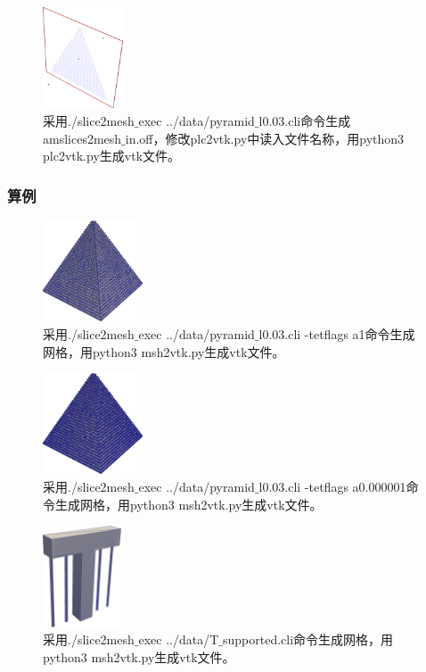 \begin{figure}[!htbp]
  \centering
  \includegraphics[height=3cm]{fig/1/1.1.7.1:6.png}
  \caption{采用./slice2mesh$\_$exec ../data/pyramid$\_$l0.03.cli命令生成amslices2mesh$\_$in.off，修改plc2vtk.py中读入文件名称，用python3 plc2vtk.py生成vtk文件。}
  \label{fig:1-7}
\end{figure}


\subsubsection{算例}

\begin{figure}[!htbp]
  \centering
  \includegraphics[height=3cm]{fig/1/20.png}
  \caption{采用./slice2mesh$\_$exec ../data/pyramid$\_$l0.03.cli -tetflags a1命令生成网格，用python3 msh2vtk.py生成vtk文件。}
  \label{fig:1-7}
\end{figure}

\begin{figure}[!htbp]
  \centering
  \includegraphics[height=3cm]{fig/1/21.png}
  \caption{采用./slice2mesh$\_$exec ../data/pyramid$\_$l0.03.cli -tetflags a0.000001命令生成网格，用python3 msh2vtk.py生成vtk文件。}
  \label{fig:1-7}
\end{figure}

\begin{figure}[!htbp]
  \centering
  \includegraphics[height=3cm]{fig/1/1.1.7.2:3.png}
  \caption{采用./slice2mesh$\_$exec ../data/T$\_$supported.cli命令生成网格，用python3 msh2vtk.py生成vtk文件。}
  \label{fig:1-7}
\end{figure}


